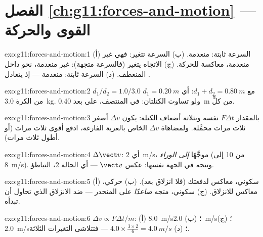 \section*{الفصل \ref{ch:g11:forces-and-motion} --- القوى والحركة}

\begin{solution}{exo:g11:forces-and-motion:1}
(أ) السرعة ثابتة:  منعدمة. (ب) السرعة تتغير: فهي غير منعدمة،
معاكسة للحركة. (ج) الاتجاه يتغير (فالسرعة متجهة):
غير منعدمة، نحو داخل المنعطف. (د) السرعة ثابتة: منعدمة ---
إذ يتعادل  .
\end{solution}

\begin{solution}{exo:g11:forces-and-motion:2}
$d_1/d_2 = 1.0/3.0$ مع $d_1 + d_2 = \qty{0.80}{m}$:
أي $d_1 = \qty{0.20}{m}$ من الكرة \qty{3.0}{kg}. ولو تساوت الكتلتان: في
المنتصف، على بعد \qty{0.40}{m} من كلٍّ.
\end{solution}

\begin{solution}{exo:g11:forces-and-motion:3}
بالمقدار $F\Delta t$ نفسه وبثلاثة أضعاف الكتلة: يكون $\Delta v$ أصغر ثلاث مرات محمَّلة.
ولمضاهاة $\Delta v$ الخاص بالعربة الفارغة، ادفع أقوى ثلاث مرات (أو
أطول ثلاث مرات).
\end{solution}

\begin{solution}{exo:g11:forces-and-motion:4}
$\Delta \vect v$: أي \qty{2}{m/s}، موجَّهًا \emph{إلى الوراء} (من
\num{10} إلى \qty{8}{m/s}). وتتجه  في الجهة نفسها:
عكس $\vect v$ --- أي الحالة 2، التباطؤ.
\end{solution}

\begin{solution}{exo:g11:forces-and-motion:5}
(أ) سكوني، معاكس لدفعتك (فلا انزلاق بعد). (ب) حركي، معاكس
للانزلاق. (ج) سكوني، متجه \emph{صاعدًا} على المنحدر --- ضد
الانزلاق الذي تحاول  أن تبدأه.
\end{solution}

\begin{solution}{exo:g11:forces-and-motion:6}
$\Delta v \propto F\Delta t/m$: (أ) \qty{8.0}{m/s}؛ (ب) \qty{2.0}{m/s}؛
(ج) \qty{2.0}{m/s}؛ (د) $4.0 \times \frac{3 \times 2}{6} =
\qty{4.0}{m/s}$ --- فتتلاشى التغيرات الثلاثة.
\end{solution}

